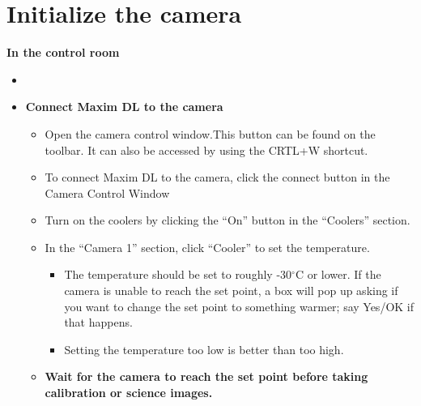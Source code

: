 \documentclass[letterpaper, 12pt]{report}
\begin{document}
\section{Initialize the camera}
{\large \textbf{In the control room}}
\begin{itemize}
\item []
\end{itemize}
\begin{itemize}
	\item \textbf{Connect Maxim DL to the camera}
	\begin{itemize}
		\item Open the camera control window.This button can be found on the toolbar. It can also be accessed by using the CRTL+W shortcut.
		\item To connect Maxim DL to the camera, click the connect button in the Camera Control Window
		\item Turn on the coolers by clicking the ``On'' button in the ``Coolers'' section.
		\item In the ``Camera 1'' section, click ``Cooler'' to set the temperature.
		\begin{itemize}
			\item The temperature should be set to roughly -30$^\circ$C or lower. If the camera is unable to reach the set point, a box will pop up asking if you want to change the set point to something warmer; say Yes/OK if that happens.
			\item Setting the temperature too low is better than too high.
		\end{itemize}
		\item {\large \textbf{Wait for the camera to reach the set point before taking calibration or science images.}}
	\end{itemize}
\end{itemize}
\end{document}
